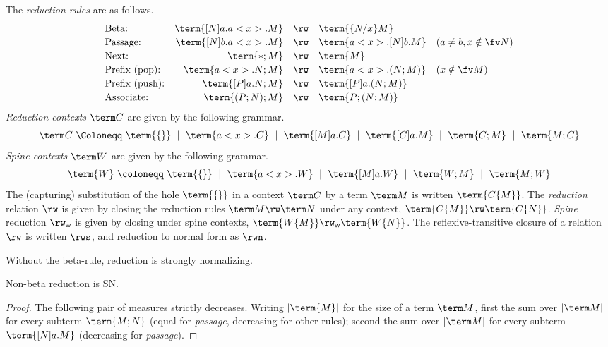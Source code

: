 \documentclass[a4paper,UKenglish,cleveref, autoref, thm-restate]{lipics-v2021}
\newcommand\spine{\mathsf w}
\begin{document}
\begin{definition}[Reduction]
The \emph{reduction rules} are as follows.
\[
\begin{array}{lrcll}
		\text{Beta:}          & \term{[N]a.a<x>.M} & \rw & \term{\{N/x\}M}
\\[2pt]	\text{Passage:}       & \term{[N]b.a<x>.M} & \rw & \term{a<x>.[N]b.M} & (a\neq b, x\notin\fv N)
\\[2pt] \text{Next:}          & \term{*;M}		   & \rw & \term{M}
\\[2pt] \text{Prefix (pop):}  & \term{a<x>.N ; M}  & \rw & \term{a<x>.(N;M)}  & (x\notin\fv M)
\\[2pt] \text{Prefix (push):} & \term{[P]a.N ; M}  & \rw & \term{[P]a.(N;M)}
\\[2pt] \text{Associate:}     & \term{(P;N) ; M}   & \rw & \term{P ; (N ; M)}
\end{array}
\]
\emph{Reduction contexts} $\term C$ are given by the following grammar.
\[
	\term C~\Coloneqq~
		\term{\{\}}
~\mid~	\term{a<x>.C}
~\mid~	\term{[M]a.C}
~\mid~	\term{[C]a.M}
~\mid~	\term{C;M}
~\mid~	\term{M;C}
\]
\emph{Spine contexts} $\term W$ are given by the following grammar.
\[
	\term{W}
~\coloneqq~ \term{\{\}}
~\mid~      \term{a<x>.W}
~\mid~      \term{[M]a.W}
~\mid~      \term{W;M}
~\mid~      \term{M;W}
\]
The (capturing) substitution of the hole $\term{\{\}}$ in a context $\term C$ by a term $\term M$ is written $\term{C\{M\}}$. The \emph{reduction} relation $\rw$ is given by closing the reduction rules $\term M\rw\term N$ under any context, $\term{C\{M\}}\rw\term{C\{N\}}$. \emph{Spine} reduction $\rw_\spine$ is given by closing under spine contexts, $\term{W\{M\}}\rw_\spine\term{W\{N\}}$. The reflexive-transitive closure of a relation $\rw$ is written $\rws$, and reduction to normal form as $\rwn$.
\end{definition}

Without the beta-rule, reduction is strongly normalizing.

\begin{proposition}
\label{prop:non-beta SN}
Non-beta reduction is SN.
\end{proposition}

\begin{proof}
The following pair of measures strictly decreases. Writing $|\term{M}|$ for the size of a term $\term M$, first the sum over $|\term M|$ for every subterm $\term{M;N}$ (equal for \emph{passage}, decreasing for other rules); second the sum over $|\term M|$ for every subterm $\term{[N]a.M}$ (decreasing for \emph{passage}).
\end{proof}
\end{document}
